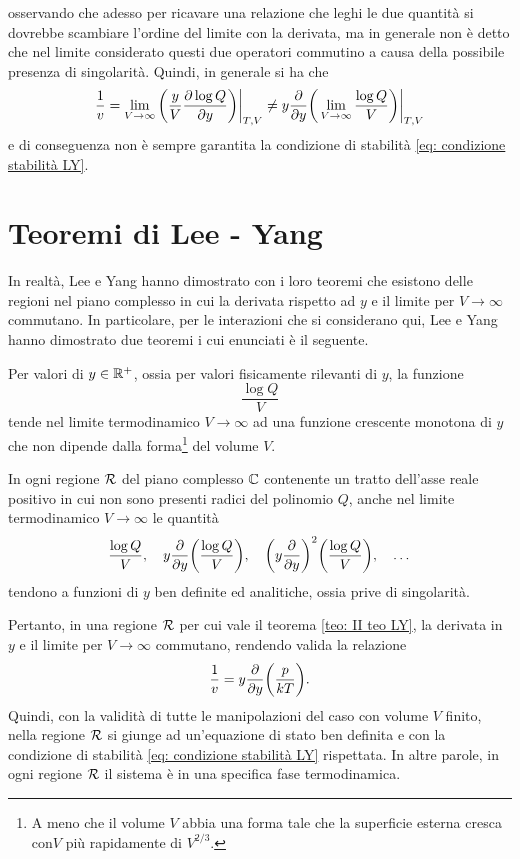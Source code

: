 osservando che adesso per ricavare una relazione che leghi le due quantità si dovrebbe scambiare l'ordine del limite con la derivata, ma in generale non è detto che nel limite considerato questi due operatori commutino a causa della possibile presenza di singolarità. Quindi, in generale si ha che 
\begin{equation}
    \frac{1}{v} = \lim_{V\to\infty}{\bigg(\dfrac{y}{V}\dfrac{\partial\log{Q}}{\partial y}\bigg)\bigg|_{T,V}} \neq y\frac{\partial}{\partial y}\bigg( \lim_{V\to\infty}{\frac{\log{Q}}{V}\bigg)\bigg|_{T,V}}
\end{equation}
e di conseguenza non è sempre garantita la condizione di stabilità \eqref{eq: condizione stabilità LY}. 

\section{Teoremi di Lee - Yang}
In realtà, Lee e Yang hanno dimostrato con i loro teoremi che esistono delle regioni nel piano complesso in cui la derivata rispetto ad $y$ e il limite per $V \to \infty$ commutano. In particolare, per le interazioni che si considerano qui, Lee e Yang hanno dimostrato due teoremi i cui enunciati è il seguente. 
\begin{teo}
\label{teo: I teo LY}
    Per valori di $y \in \mathbb{R}^+$, ossia per valori fisicamente rilevanti di $y$, la funzione 
    \begin{equation}
        \frac{\log{Q}}{V}
    \end{equation}
    tende nel limite termodinamico $V\to\infty$ ad una funzione crescente monotona di $y$ che non dipende dalla forma\footnote{A meno che il volume $V$ abbia una forma tale che la superficie esterna cresca con$V$ più rapidamente di $V^{2/3}$.} del volume $V$.
\end{teo}
\begin{teo}
\label{teo: II teo LY}
    In ogni regione $\mathcal{R}$ del piano complesso $\mathbb{C}$ contenente un tratto dell'asse reale positivo in cui non sono presenti radici del polinomio $Q$, anche nel limite termodinamico $V \to \infty$ le quantità
    \begin{equation}
        \frac{\log{Q}}{V},\quad y\frac{\partial}{\partial y}\bigg(\frac{\log{Q}}{V}\bigg),\quad \bigg(y\frac{\partial}{\partial y}\bigg)^2\bigg(\frac{\log{Q}}{V}\bigg),\quad\dots
    \end{equation}
    tendono a funzioni di $y$ ben definite ed analitiche, ossia prive di singolarità.
\end{teo}
Pertanto, in una regione $\mathcal{R}$ per cui vale il teorema \eqref{teo: II teo LY}, la derivata in $y$ e il limite per $V \to \infty$ commutano, rendendo valida la relazione
\begin{equation}
    \frac{1}{v} = y\frac{\partial}{\partial y}\bigg(\frac{p}{kT}\bigg).
\end{equation}
Quindi, con la validità di tutte le manipolazioni del caso con volume $V$ finito, nella regione $\mathcal{R}$ si giunge ad un'equazione di stato ben definita e con la condizione di stabilità \eqref{eq: condizione stabilità LY} rispettata. In altre parole, in ogni regione $\mathcal{R}$ il sistema è in una specifica fase termodinamica. 

